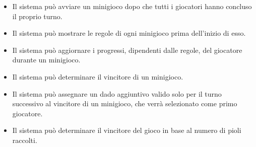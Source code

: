 \begin{itemize}
      \item Il sistema può avviare un minigioco dopo che tutti i giocatori hanno concluso
            il proprio turno.
      \item Il sistema può mostrare le regole di ogni minigioco prima dell'inizio di esso.
      \item Il sistema può aggiornare i progressi, dipendenti dalle regole, del giocatore 
            durante un minigioco.
      \item Il sistema può determinare il vincitore di un minigioco.
      \item Il sistema può assegnare un dado aggiuntivo valido solo per il turno successivo al
            vincitore di un minigioco, che verrà selezionato come primo giocatore.
      \item Il sistema può determinare il vincitore del gioco in base al numero di pioli raccolti.
\end{itemize}

